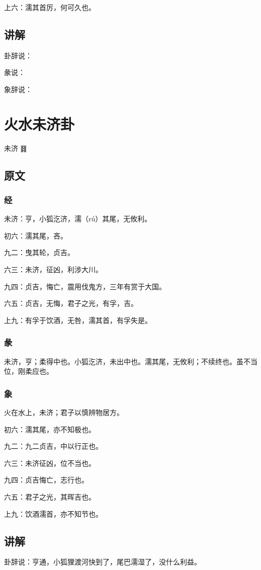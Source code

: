\documentclass[12pt,oneside]{book}
\begin{document}
上六：濡其首厉，何可久也。

\section{讲解}
卦辞说：

彖说：

象辞说：

\chapter{火水未济卦}
未济 {\Large ䷿}
\section{原文}

\subsection{经}
未济：亨，小狐汔济，濡（rú）其尾，无攸利。

初六：濡其尾，吝。

九二：曳其轮，贞吉。

六三：未济，征凶，利涉大川。

九四：贞吉，悔亡，震用伐鬼方，三年有赏于大国。

六五：贞吉，无悔，君子之光，有孚，吉。

上九：有孚于饮酒，无咎，濡其首，有孚失是。

\subsection{彖}
未济，亨；柔得中也。小狐汔济，未出中也。濡其尾，无攸利；不续终也。虽不当位，刚柔应也。

\subsection{象}
火在水上，未济；君子以慎辨物居方。

初六：濡其尾，亦不知极也。

九二：九二贞吉，中以行正也。

六三：未济征凶，位不当也。

九四：贞吉悔亡，志行也。

六五：君子之光，其晖吉也。

上九：饮酒濡首，亦不知节也。

\section{讲解}
卦辞说：亨通，小狐狸渡河快到了，尾巴濡湿了，没什么利益。
\end{document}
